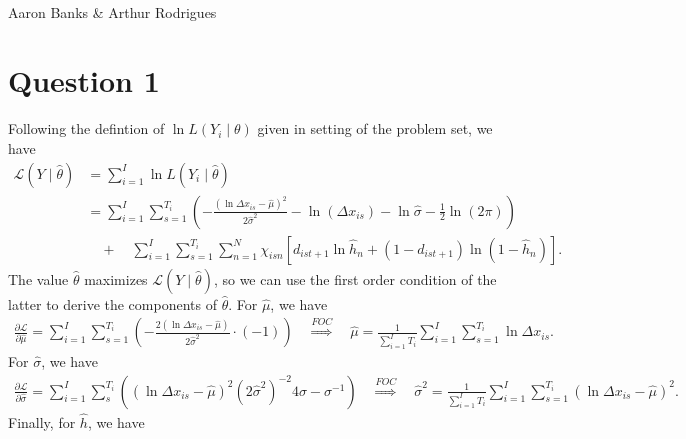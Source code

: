 \documentclass{article}
\begin{document}
\begin{center}
    \textbf{}\\
    Aaron Banks \& Arthur Rodrigues
\end{center}

\section*{Question 1}

Following the defintion of $\ln L(Y_i \mid \theta)$ given in setting of the problem set, we have 
\begin{equation}\label{eq:q1_L}
    \begin{aligned}
        \mathcal{L}(Y \mid \hat{\theta}) &= \sum_{i=1}^I \ln L(Y_i \mid \hat{\theta}) \\ 
        &= \sum_{i=1}^I \sum_{s=1}^{T_i}\left(
            - \frac{(\ln \Delta x_{is} - \hat{\mu})^2}{2\hat{\sigma}^2} - 
            \ln(\Delta x_{is}) - \ln \hat{\sigma} - \frac{1}{2}\ln(2\pi)
        \right)\\
        &\quad + \quad
        \sum_{i=1}^I \sum_{s=1}^{T_i}\sum_{n=1}^N 
        \chi_{isn} [
            d_{ist+1}\ln \hat{h}_n + (1-d_{ist+1})\ln (1 - \hat{h}_n)
        ].
    \end{aligned}
\end{equation}
The value $\hat{\theta}$ maximizes $\mathcal{L}(Y \mid \hat{\theta})$, so we can use 
the first order condition of the latter to derive the components of $\hat{\theta}$. 
For $\hat{\mu}$, we have 
\begin{align*}
    \frac{\partial \mathcal{L}}{\partial \hat{\mu}}
     = \sum_{i=1}^I \sum_{s=1}^{T_i}\left(
            - \frac{2 (\ln \Delta x_{is} - \hat{\mu})}{2 \hat{\sigma}^2} \cdot (-1)
        \right)
        \quad \overset{FOC}{\Rightarrow} \quad 
        \hat{\mu} = 
        \frac{1}{\sum_{i=1}^I T_i} \sum_{i=1}^I \sum_{s=1}^{T_i} \ln \Delta x_{is}.
\end{align*}
For $\hat{\sigma}$, we have
\begin{align*}
    \frac{\partial \mathcal{L}}{\partial \hat{\sigma}} = 
    \sum_{i=1}^I\sum_{s}^{T_i} \left(
        (\ln \Delta x_{is} - \hat{\mu})^2 (2 \hat{\sigma}^2)^{-2}4\sigma - \sigma^{-1}
    \right)
    \quad \overset{FOC}{\Rightarrow} \quad 
    \hat{\sigma}^2 = \frac{1}{ \sum_{i=1}^I T_i} \sum_{i=1}^I\sum_{s=1}^{T_i} \left(
        \ln \Delta x_{is} - \hat{\mu}
    \right)^2.
\end{align*}
Finally, for $\hat{h}$, we have 
\end{document}
